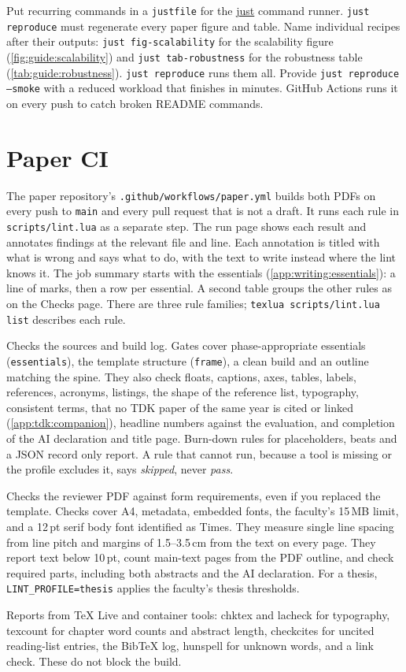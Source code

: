 Put recurring commands in a \texttt{justfile} for the \href{https://github.com/casey/just}{just} command runner. \texttt{just reproduce} must regenerate every paper figure and table. Name individual recipes after their outputs: \texttt{just fig-scalability} for the scalability figure (\cref{fig:guide:scalability}) and \texttt{just tab-robustness} for the robustness table (\cref{tab:guide:robustness}). \texttt{just reproduce} runs them all. Provide \texttt{just reproduce --smoke} with a reduced workload that finishes in minutes. GitHub Actions runs it on every push to catch broken README commands.

\section{Paper CI}\label{app:code:paperci}
The paper repository's \texttt{.github/workflows/paper.yml} builds both PDFs on every push to \texttt{main} and every pull request that is not a draft. It runs each rule in \texttt{scripts/lint.lua} as a separate step. The run page shows each result and annotates findings at the relevant file and line. Each annotation is titled with what is wrong and says what to do, with the text to write instead where the lint knows it. The job summary starts with the essentials (\cref{app:writing:essentials}): a line of marks, then a row per essential. A second table groups the other rules as on the Checks page. There are three rule families; \texttt{texlua scripts/lint.lua list} describes each rule.
\begin{description}[noitemsep]
  \item[source] Checks the sources and build log. Gates cover phase-appropriate essentials (\texttt{essentials}), the template structure (\texttt{frame}), a clean build and an outline matching the spine. They also check floats, captions, axes, tables, labels, references, acronyms, listings, the shape of the reference list, typography, consistent terms, that no TDK paper of the same year is cited or linked (\cref{app:tdk:companion}), headline numbers against the evaluation, and completion of the AI declaration and title page. Burn-down rules for placeholders, beats and a JSON record only report. A rule that cannot run, because a tool is missing or the profile excludes it, says \emph{skipped}, never \emph{pass}.
  \item[pdf] Checks the reviewer PDF against form requirements, even if you replaced the template. Checks cover A4, metadata, embedded fonts, the faculty's 15\,MB limit, and a 12\,pt serif body font identified as Times. They measure single line spacing from line pitch and margins of 1.5--3.5\,cm from the text on every page. They report text below 10\,pt, count main-text pages from the PDF outline, and check required parts, including both abstracts and the AI declaration. For a thesis, \texttt{LINT\_PROFILE=thesis} applies the faculty's thesis thresholds.
  \item[tools] Reports from TeX Live and container tools: chktex and lacheck for typography, texcount for chapter word counts and abstract length, checkcites for uncited reading-list entries, the BibTeX log, hunspell for unknown words, and a link check. These do not block the build.
\end{description}

